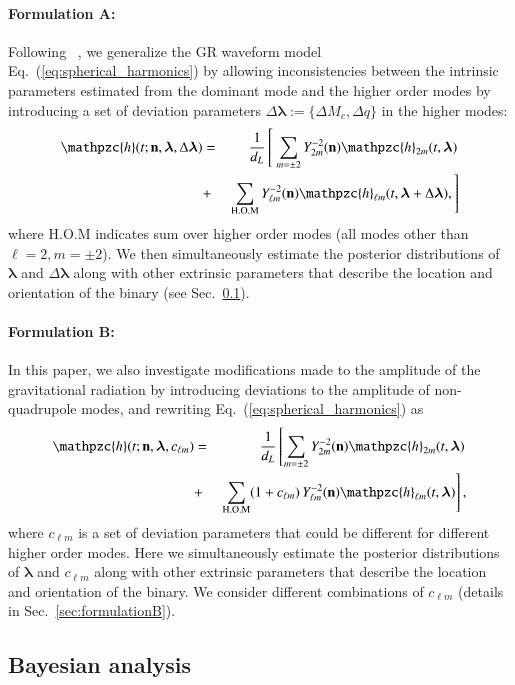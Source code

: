 \documentclass[prd,preprintnumbers,twocolumn,eqsecnum,floatfix,a4paper,nofootinbib,superscriptaddress]{revtex4}
\newcommand{\h}{\mathpzc{h}}
\newcommand{\hlm}{\mathpzc{h}_{\ell m}}
\newcommand{\Ylm}{{Y}^{-2}_{\ell m}}
\newcommand{\blambda}{\bm{\lambda}}
\newcommand{\n}{\mathbf{n}}
\begin{document}
\paragraph{Formulation A:}
	Following ~\cite{Dhanpal:2018ufk}, we generalize the GR waveform model Eq.~(\ref{eq:spherical_harmonics}) by allowing inconsistencies between the intrinsic parameters estimated from the dominant mode and the higher order modes by introducing a set of deviation parameters $\Delta \blambda := \{\Delta M_c, \Delta q\}$ in the higher modes: 
	\begin{eqnarray}
	\h(t; \n, \blambda, \Delta \blambda) & = &  \frac{1}{d_L} \left[ ~ \sum_{m = \pm2} Y^{-2}_{2m} (\n) {\h}_{2m}(t, \blambda) \right. \nonumber \\ 
	& + & \left. \sum _{\text{H.O.M}} \Ylm (\n) \hlm(t, \blambda+\Delta \blambda), \right]
	\label{eq:test_1}
	\end{eqnarray}
where {H.O.M} indicates sum over higher order modes (all modes other than $\ell = 2, m = \pm 2$). We then simultaneously estimate the posterior distributions of $\blambda$ and $\Delta \blambda$ along with other extrinsic parameters that describe the location and orientation of the binary (see Sec.~\ref{sec:bayesian_analsysis}). 

\paragraph{Formulation B:}
In this paper, we also investigate modifications made to the amplitude of the gravitational radiation by introducing deviations to the amplitude of non-quadrupole modes, and rewriting Eq.~(\ref{eq:spherical_harmonics}) as
	\begin{eqnarray}
	{\h}(t; \n, \blambda, c_{\ell m}) & = & \frac{1}{d_L} \left[ \sum_{m = \pm2} Y^{-2}_{2m} (\n) {\h}_{2m}(t, \blambda)  \right. \nonumber \\ 
	& + & \left. \sum _{\text{H.O.M}} (1+{c_{\ell m}}) \, \Ylm (\n) \hlm(t, \blambda) \right] ,
	\label{eq:test_2}
	\end{eqnarray}
	where $c_{\ell m}$ is a set of deviation parameters that could be different for different higher order modes. Here we simultaneously estimate the posterior distributions of $\blambda$ and ${c_{\ell m}}$  along with other extrinsic parameters that describe the location and orientation of the binary. We consider different combinations of ${c_{\ell m}}$ (details in Sec.~\ref{sec:formulationB}). 

\subsection{Bayesian analysis}
\label{sec:bayesian_analsysis}
\end{document}
